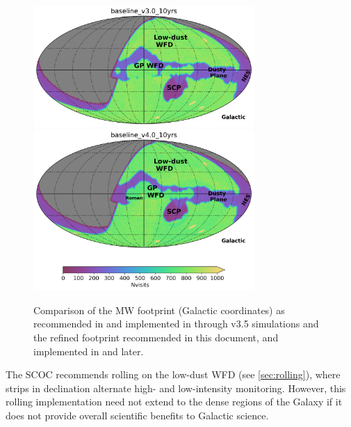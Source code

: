 \begin{figure}
\centering
    \includegraphics[width=0.75\textwidth]{figures/baseline_v3_0_10yrs_nvisits_galactic.png}
    \includegraphics[width=0.75\textwidth]{figures/baseline_v4_0_10yrs_nvisits_galactic.png}
    \caption{Comparison of the MW footprint (Galactic coordinates) as recommended in  and implemented in  through v3.5 simulations and the refined footprint recommended in this document, and implemented in  and later.}\label{fig:gpfootprint}
\end{figure}

The SCOC recommends rolling on the low-dust WFD (see \autoref{sec:rolling}), where strips in declination alternate high- and low-intensity monitoring. 
However, this rolling implementation need not extend to the dense regions of the Galaxy if it does not provide overall scientific benefits to Galactic science.

